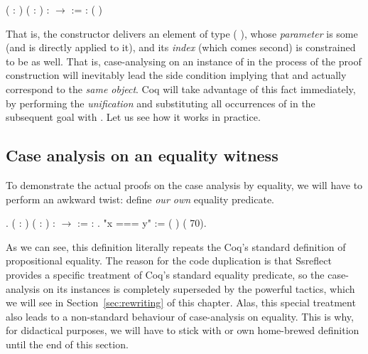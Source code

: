 \coqdoceol
\coqdocemptyline
\coqdocnoindent
{}  ( : ) ( : ) :  \ensuremath{\rightarrow}  :=   : ( ) 

\coqdocemptyline


That is, the constructor  delivers an element of type ( ),
whose \textit{parameter} is some  (and  is directly applied to it),
and its \textit{index} (which comes second) is constrained to be  as
well. That is, case-analysing on an instance of    in the
process of the proof construction will inevitably lead the side
condition implying that  and  actually correspond to the \textit{same
object}. Coq will take advantage of this fact immediately, by
performing the \textit{unification}  and substituting
all occurrences of  in the subsequent goal with .  Let us see
how it works in practice.


\subsection{Case analysis on an equality witness}




To demonstrate the actual proofs on the case analysis by equality, we
will have to perform an awkward twist: define \textit{our own} equality
predicate. 




\begin{coqdoccode}
\coqdocemptyline
\coqdocnoindent
{}.\coqdoceol
\coqdocnoindent
{}  ( : ) ( : ) :  \ensuremath{\rightarrow}  :=   :   .\coqdoceol
\coqdocnoindent
{} "x === y" := (  ) (  70).\coqdoceol
\coqdocemptyline
\end{coqdoccode}


As we can see, this definition literally repeats the Coq's standard
definition of propositional equality. The reason for the code
duplication is that Ssreflect provides a specific treatment of Coq's
standard equality predicate, so the case-analysis on its instances is
completely superseded by the powerful  tactics, which we will
see in Section~\ref{sec:rewriting} of this chapter. Alas, this
special treatment also leads to a non-standard behaviour of
case-analysis on equality. This is why, for didactical purposes, we
will have to stick with or own home-brewed definition until the end of
this section.


